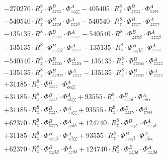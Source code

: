 \documentclass{article}
\begin{document}
\begin{subequations}
\begin{gather}
\begin{array}{c}
 \\[0.2em] 		 - 270270 \cdot R_{z}^{8} \cdot \Phi{}^{B}_{zzzz} \cdot \Phi{}^{A}_{zz\zeta{}\zeta{}}- 405405 \cdot R_{z}^{8} \cdot \Phi{}^{B}_{zzzz} \cdot \Phi{}^{A}_{zz\epsilon{}\epsilon{}} 
 \\[0.2em] 		 - 540540 \cdot R_{z}^{8} \cdot \Phi{}^{B}_{zzz\delta{}} \cdot \Phi{}^{A}_{zzz\delta{}}- 540540 \cdot R_{z}^{8} \cdot \Phi{}^{B}_{zzz\gamma{}} \cdot \Phi{}^{A}_{zzz\gamma{}} 
 \\[0.2em] 		 - 135135 \cdot R_{z}^{8} \cdot \Phi{}^{B}_{zz\gamma{}\gamma{}} \cdot \Phi{}^{A}_{zzzz}- 540540 \cdot R_{z}^{8} \cdot \Phi{}^{B}_{zzz\beta{}} \cdot \Phi{}^{A}_{zzz\beta{}} 
 \\[0.2em] 		 - 135135 \cdot R_{z}^{8} \cdot \Phi{}^{B}_{zz\beta{}\beta{}} \cdot \Phi{}^{A}_{zzzz}- 135135 \cdot R_{z}^{8} \cdot \Phi{}^{B}_{zz\beta{}\beta{}} \cdot \Phi{}^{A}_{zzzz} 
 \\[0.2em] 		 - 540540 \cdot R_{z}^{8} \cdot \Phi{}^{B}_{zzz\alpha{}} \cdot \Phi{}^{A}_{zzz\alpha{}}- 135135 \cdot R_{z}^{8} \cdot \Phi{}^{B}_{zz\alpha{}\alpha{}} \cdot \Phi{}^{A}_{zzzz} 
 \\[0.2em] 		 - 135135 \cdot R_{z}^{8} \cdot \Phi{}^{B}_{zz\alpha{}\alpha{}} \cdot \Phi{}^{A}_{zzzz}- 135135 \cdot R_{z}^{8} \cdot \Phi{}^{B}_{zz\alpha{}\alpha{}} \cdot \Phi{}^{A}_{zzzz} 
 \\[0.2em] 		 + 31185 \cdot R_{z}^{8} \cdot \Phi{}^{B}_{zzzz} \cdot \Phi{}^{A}_{\epsilon{}\epsilon{}\zeta{}\zeta{}} 
 \\[0.2em] 		 + 31185 \cdot R_{z}^{8} \cdot \Phi{}^{B}_{zzz\delta{}} \cdot \Phi{}^{A}_{z\delta{}\zeta{}\zeta{}}+ 93555 \cdot R_{z}^{8} \cdot \Phi{}^{B}_{zzz\delta{}} \cdot \Phi{}^{A}_{z\delta{}\epsilon{}\epsilon{}} 
 \\[0.2em] 		 + 31185 \cdot R_{z}^{8} \cdot \Phi{}^{B}_{zzz\gamma{}} \cdot \Phi{}^{A}_{z\gamma{}\zeta{}\zeta{}}+ 93555 \cdot R_{z}^{8} \cdot \Phi{}^{B}_{zzz\gamma{}} \cdot \Phi{}^{A}_{z\gamma{}\epsilon{}\epsilon{}} 
 \\[0.2em] 		 + 62370 \cdot R_{z}^{8} \cdot \Phi{}^{B}_{zz\gamma{}\gamma{}} \cdot \Phi{}^{A}_{zz\delta{}\delta{}}+ 124740 \cdot R_{z}^{8} \cdot \Phi{}^{B}_{zz\gamma{}\delta{}} \cdot \Phi{}^{A}_{zz\gamma{}\delta{}} 
 \\[0.2em] 		 + 31185 \cdot R_{z}^{8} \cdot \Phi{}^{B}_{zzz\beta{}} \cdot \Phi{}^{A}_{z\beta{}\zeta{}\zeta{}}+ 93555 \cdot R_{z}^{8} \cdot \Phi{}^{B}_{zzz\beta{}} \cdot \Phi{}^{A}_{z\beta{}\epsilon{}\epsilon{}} 
 \\[0.2em] 		 + 62370 \cdot R_{z}^{8} \cdot \Phi{}^{B}_{zz\beta{}\beta{}} \cdot \Phi{}^{A}_{zz\delta{}\delta{}}+ 124740 \cdot R_{z}^{8} \cdot \Phi{}^{B}_{zz\beta{}\delta{}} \cdot \Phi{}^{A}_{zz\beta{}\delta{}} 

\end{array}
\end{gather}
\end{subequations}
\end{document}
